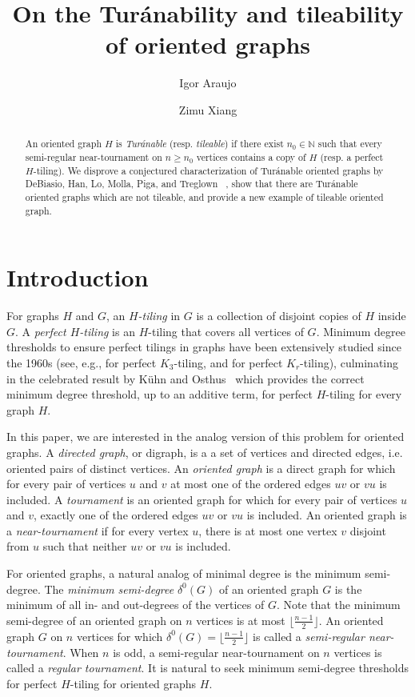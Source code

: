 \documentclass[11pt]{amsart}
\title{On the Tur\'anability and tileability of oriented graphs}
\author{Igor Araujo}
\author{Zimu Xiang}
\date{}
\begin{document}
\begin{abstract}
    An oriented graph $H$ is \emph{Tur\'anable} (resp. \emph{tileable}) if there exist $n_0 \in \mathbb{N}$ such that every semi-regular near-tournament on $n \ge n_0$ vertices contains a copy of $H$ (resp. a perfect $H$-tiling). We disprove a conjectured characterization of Tur\'anable oriented graphs by DeBiasio, Han, Lo, Molla, Piga, and Treglown~\cite{DHLMPT}%
    , show that there are Tur\'anable oriented graphs which are not tileable, and provide a new example of tileable oriented graph. 
\end{abstract}

\maketitle

\section{Introduction}

For graphs $H$ and $G$, an \emph{$H$-tiling} in $G$ is a collection of disjoint copies of $H$ inside $G$. A \emph{perfect $H$-tiling} is an $H$-tiling that covers all vertices of $G$. Minimum degree thresholds to ensure perfect tilings in graphs have been extensively studied since the 1960s (see, e.g., \cite{corradi} for perfect $K_3$-tiling, and \cite{hajnal} for perfect $K_r$-tiling), culminating in the celebrated result by K\"uhn and Osthus~\cite{kuhn-osthus} which provides the correct minimum degree threshold, up to an additive term, for perfect $H$-tiling for every graph $H$. 

In this paper, we are interested in the analog version of this problem for oriented graphs.
A \emph{directed graph}, or digraph, is a a set of vertices and directed edges, i.e. oriented pairs of distinct vertices. An \emph{oriented graph} is a direct graph for which for every pair of vertices $u$ and $v$ at most one of the ordered edges $uv$ or $vu$ is included. A \emph{tournament} is an oriented graph for which for every pair of vertices $u$ and $v$, exactly one of the ordered edges $uv$ or $vu$ is included.
An oriented graph is a \emph{near-tournament} if for every vertex $u$, there is at most one vertex $v$ disjoint from $u$ such that neither $uv$ or $vu$ is included.

For oriented graphs, a natural analog of minimal degree is the minimum semi-degree. The \emph{minimum semi-degree} $\delta^0(G)$ of an oriented graph $G$ is the minimum of all in- and out-degrees of the vertices of $G$. 
Note that the minimum semi-degree of an oriented graph on $n$ vertices is at most $\lfloor \frac{n-1}{2} \rfloor$. An oriented graph $G$ on $n$ vertices for which $\delta^0(G) = \lfloor \frac{n-1}{2} \rfloor$ is called a \emph{semi-regular near-tournament}. When $n$ is odd, a semi-regular near-tournament on $n$ vertices is called a \emph{regular tournament}.
It is natural to seek minimum semi-degree thresholds for perfect $H$-tiling for oriented graphs $H$.
\end{document}
